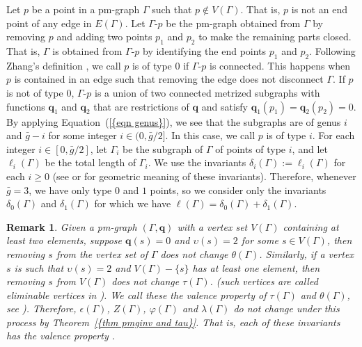 \documentclass[12pt]{amsart}
\theoremstyle{example}
\newtheorem{remark}[theorem]{Remark}
\theoremstyle{definition}
\theoremstyle{notation}
\begin{document}
Let $p$ be a point in a pm-graph ${\Gamma}$ such that $p \not \in {V({\Gamma})}$. That is, $p$ is not an end point of any edge in ${E({\Gamma})}$. Let ${\Gamma}$-${p}$ be the pm-graph obtained from ${\Gamma}$ by removing $p$ and adding two points $p_1$ and $p_2$ to make the remaining parts closed. That is, ${\Gamma}$ is obtained
from ${\Gamma}$-$p$ by identifying the end points $p_1$ and $p_2$. Following Zhang's definition \cite[Section 4.1]{Zh2}, we call $p$ is of type $0$ if ${\Gamma}$-${p}$ is connected. This happens when $p$ is contained in an edge such that removing the edge does not disconnect ${\Gamma}$. If $p$ is not of type $0$, ${\Gamma}$-${p}$ is a union of two connected metrized subgraphs with functions ${\textbf{q}}_1$ and ${\textbf{q}}_2$ that are restrictions of ${\textbf{q}}$ and satisfy ${\textbf{q}}_1(p_1)={\textbf{q}}_2(p_2)=0$. By applying {Equation~(\ref{{eqn genus}})}, we see that the subgraphs are of genus $i$ and ${\bar{g}} - i$ for some integer $i \in (0,{\bar{g}}/2]$. In this case, we call $p$ is of type $i$. For each integer $i \in [0,{\bar{g}}/2]$, let ${\Gamma}_i$ be the subgraph of ${\Gamma}$ of points of type $i$, and let $\ell_i({\Gamma})$ be the total length of ${\Gamma}_i$. We use the invariants $\delta_i (\Gamma):=\ell_i({\Gamma})$ for each $i \geq 0$ (see \cite{C5} or \cite{Zh2} for geometric meaning of these invariants). Therefore, whenever ${\bar{g}} =3$, we have only type $0$ and $1$ points, so we consider only the invariants $\delta_0 (\Gamma)$ and $\delta_1 (\Gamma)$ for which we have ${\ell ({\Gamma})}=\delta_0 (\Gamma)+\delta_1 (\Gamma)$.

\begin{remark}\label{rem valence}
Given a pm-graph $({\Gamma},{\textbf{q}})$ with a vertex set ${V({\Gamma})}$ containing at least two elements, suppose ${\textbf{q}} (s)=0$ and ${\upsilon}(s)=2$ for some $s \in {V({\Gamma})}$, then removing $s$ from the vertex set of ${\Gamma}$ does not change ${\theta ({\Gamma})}$. Similarly, if a vertex $s$ is such that ${\upsilon}(s)=2$ and ${V({\Gamma})}-\{s \}$ has at least one element, then removing $s$ from ${V({\Gamma})}$ does not change ${\tau(\Gamma)}$.
(such vertices are called eliminable vertices in \cite[pg. 152]{KY1}). We call these the {\em valence property} of ${\tau(\Gamma)}$ and ${\theta ({\Gamma})}$, see \cite[Remark 2.10]{C2}).
Therefore, ${\epsilon({\Gamma})}$, $Z({\Gamma})$, ${\varphi ({\Gamma})}$ and ${\lambda ({\Gamma})}$ do not change under this process by {Theorem~\ref{{thm pmginv and tau}}}. That is, each of these invariants has the valence property \cite[Remark 2.4]{ZCGraphInvComp}.
\end{remark}
\end{document}
